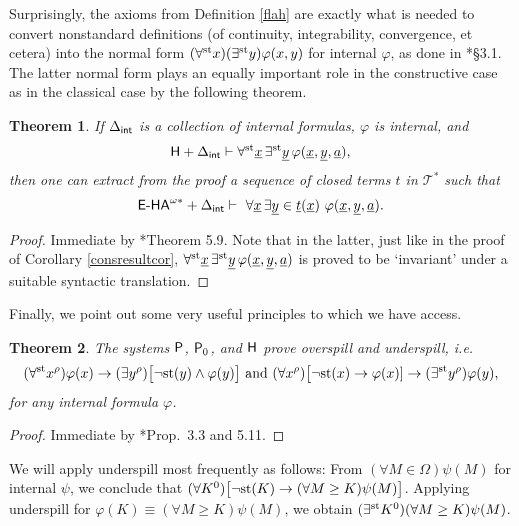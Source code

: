 \documentclass[reqno]{amsart}
\newtheorem{thm}{Theorem}
\newcommand\be{\begin{equation}}
\newcommand\ee{\end{equation}}
\def\H{\textup{\textsf{H}}}
\def\P{\textup{\textsf{P}}}
\def\st{\textup{st}}
\def\di{\rightarrow}
\newcommand{\tup}{\underline} %
\def\forallst{\forall^{\st}}
\def\existsst{\exists^{\st}}
\def\intern{\textup{\textsf{int}}}
\numberwithin{equation}{section}
\numberwithin{thm}{section}
\begin{document}
Surprisingly, the axioms from Definition \ref{flah} are exactly what is needed to convert nonstandard definitions (of continuity, integrability, convergence, et cetera) into the normal form $(\forall^{\st}x)(\exists^{\st}y)\varphi(x, y)$ for internal $\varphi$, as done in \cite{sambon}*{\S3.1}.
The latter normal form plays an equally important role in the constructive case as in the classical case by the following theorem.  
\begin{thm}\label{consresult2}
If $\Delta_{\intern}$ is a collection of internal formulas, $\varphi$ is internal, and
\be\label{antecedn3}
\textup{\textsf{H}} + \Delta_{\intern} \vdash \forallst \tup x \, \existsst \tup y \, \varphi(\tup x, \tup y, \tup a), 
\ee
then one can extract from the proof a sequence of closed terms $t$ in $\mathcal{T}^{*}$ such that
\be\label{consequalty3}
\textup{\textsf{E-HA}}^{\omega*} + \Delta_{\intern} \vdash\  \forall \tup x \, \exists \tup y\in \tup t(\tup x)\ \varphi(\tup x,\tup y, \tup a).
\ee
\end{thm}
\begin{proof}
Immediate by \cite{brie}*{Theorem 5.9}.  Note that in the latter, just like in the proof of Corollary \ref{consresultcor}, $\forallst \tup x \, \existsst \tup y \, \varphi(\tup x, \tup y, \tup a) $ is proved to be `invariant' under a suitable syntactic translation.  
\end{proof}
Finally, we point out some very useful principles to which we have access.  
\begin{thm}\label{doppi}
The systems $\P$, $\P_{0}$, and $\H$ prove \emph{overspill} and \emph{underspill}, i.e.\
\[%
(\forall^{\st}x^{\rho})\varphi(x)\di (\exists y^{\rho})\big[\neg\st(y)\wedge \varphi(y)  \big] \textup{ and }(\forall x^{\rho})\big[\neg\st(x)\di \varphi(x)]\di (\exists^{\st} y^{\rho})\varphi(y),
\]
for any internal formula $\varphi$.
\end{thm}
\begin{proof}
Immediate by \cite{brie}*{Prop.\ 3.3 and 5.11}.  
\end{proof}
We will apply underspill most frequently as follows:  From $(\forall M\in \Omega)\psi(M)$ for internal $\psi$, we conclude that $(\forall K^{0})\big[\neg\st(K)\di (\forall M\geq K)\psi(M) \big]$.  Applying underspill for $\varphi(K)\equiv (\forall M\geq K)\psi(M)$, we obtain $(\exists^{\st} K^{0}) (\forall M\geq K)\psi(M)$.   
\end{document}

